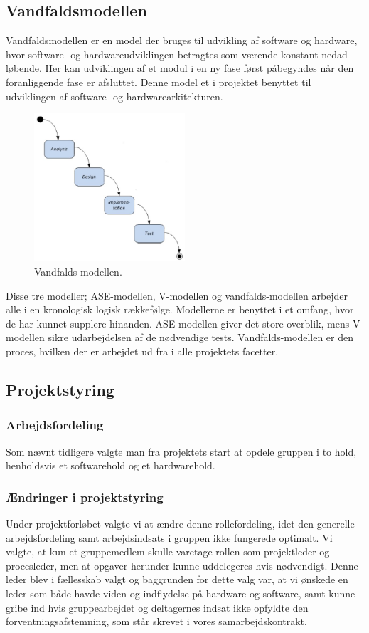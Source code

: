\subsection{Vandfaldsmodellen}
Vandfaldsmodellen er en model der bruges til udvikling af software og hardware, hvor software- og hardwareudviklingen betragtes som værende konstant nedad løbende. Her kan udviklingen af et modul i en ny fase først påbegyndes når den foranliggende fase er afsluttet. Denne model et i projektet benyttet til udviklingen af software- og hardwarearkitekturen. 
\begin{figure}[H]
\includegraphics[width =0.5\textwidth , center]{billeder/Vandfald}
\caption{Vandfalds modellen.}
\end{figure} 
Disse tre modeller; ASE-modellen, V-modellen og vandfalds-modellen arbejder alle i en kronologisk logisk rækkefølge. Modellerne er benyttet i et omfang, hvor de har kunnet supplere hinanden. ASE-modellen giver det store overblik, mens V-modellen sikre udarbejdelsen af de nødvendige tests. Vandfalds-modellen er den proces, hvilken der er arbejdet ud fra i alle projektets facetter.   
\subsection{Projektstyring}
\subsubsection{Arbejdsfordeling}
Som nævnt tidligere valgte man fra projektets start at opdele gruppen i to hold, henholdsvis et softwarehold og et hardwarehold.
\subsubsection{Ændringer i projektstyring}
Under projektforløbet valgte vi at ændre denne rollefordeling, idet den generelle arbejdsfordeling samt arbejdsindsats i gruppen ikke fungerede optimalt. Vi valgte, at kun et gruppemedlem skulle varetage rollen som projektleder og procesleder, men at opgaver herunder kunne uddelegeres hvis nødvendigt. Denne leder blev i fællesskab valgt og baggrunden for dette valg var, at vi ønskede en leder som både havde viden og indflydelse på hardware og software, samt kunne gribe ind hvis gruppearbejdet og deltagernes indsat ikke opfyldte den forventningsafstemning, som står skrevet i vores samarbejdskontrakt. 
